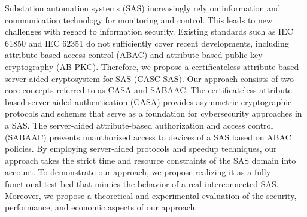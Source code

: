 \Abstract
Substation automation systems (SAS) increasingly rely on information and communication technology for monitoring and control.
This leads to new challenges with regard to information security.
Existing standards such as IEC 61850 and IEC 62351 do not sufficiently cover recent developments, including attribute-based access control (ABAC) and attribute-based public key cryptography (AB-PKC).
Therefore, we propose a certificateless attribute-based server-aided cryptosystem for SAS (CASC-SAS).
Our approach consists of two core concepts referred to as CASA and SABAAC.
The certificateless attribute-based server-aided authentication (CASA) provides asymmetric cryptographic protocols and schemes that serve as a foundation for cybersecurity approaches in a SAS.
The server-aided attribute-based authorization and access control (SABAAC) prevents unauthorized access to devices of a SAS based on ABAC policies.
By employing server-aided protocols and speedup techniques, our approach takes the strict time and resource constraints of the SAS domain into account.
To demonstrate our approach, we propose realizing it as a fully functional test bed that mimics the behavior of a real interconnected SAS.
Moreover, we propose a theoretical and experimental evaluation of the security, performance, and economic aspects of our approach.
